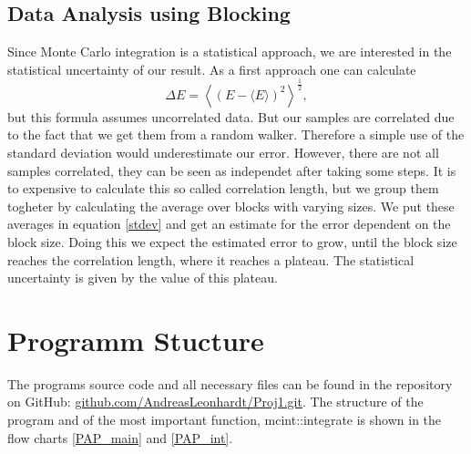 \documentclass[a4paper,10pt]{article}
\begin{document}
\subsection{Data Analysis using Blocking}

Since Monte Carlo integration is a statistical approach, we are interested in the statistical uncertainty of our result.
As a first approach one can calculate 
\begin{equation}
 \Delta E = \left\langle \left(E - \langle E\rangle\right)^2 \right\rangle^{\frac12},
 \label{stdev}
\end{equation}
but this formula assumes uncorrelated data. But our samples are correlated due to the fact that we get them from a random walker.
Therefore a simple use of the standard deviation would underestimate our error. 
However, there are not all samples correlated, they can be seen as independet after taking some steps.
It is to expensive to calculate this so called correlation length, but we group them togheter by calculating the average over blocks with varying sizes.
We put these averages in equation \ref{stdev} and get an estimate for the error dependent on the block size.
Doing this we expect the estimated error to grow, until the block size reaches the correlation length, where it reaches a plateau. 
The statistical uncertainty is given by the value of this plateau. 





\section{Programm Stucture}


The programs source code and all necessary files can be found in the repository on GitHub: 
\href{https://github.com/AndreasLeonhardt/Proj1.git}{github.com/AndreasLeonhardt/Proj1.git}.
The structure of the program and of the most important function, mcint::integrate is shown in the flow charts \ref{PAP_main} and \ref{PAP_int}.
\end{document}
